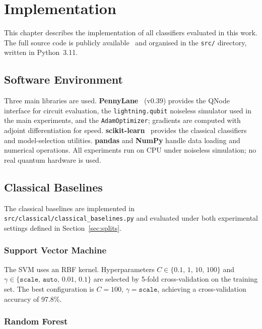 \chapter{Implementation}
\label{chap:implementation}

This chapter describes the implementation of all classifiers evaluated in this work. The full source code is publicly available~\cite{motamedifar2026repo} and organised in the \texttt{src/} directory, written in Python~3.11.

\section{Software Environment}
\label{sec:env}

Three main libraries are used. \textbf{PennyLane}~\cite{pennylane} (v0.39) provides the QNode interface for circuit evaluation, the \texttt{lightning.qubit} noiseless simulator used in the main experiments, and the \texttt{AdamOptimizer}; gradients are computed with adjoint differentiation for speed. \textbf{scikit-learn}~\cite{sklearn} provides the classical classifiers and model-selection utilities. \textbf{pandas} and \textbf{NumPy} handle data loading and numerical operations. All experiments run on CPU under noiseless simulation; no real quantum hardware is used.

\section{Classical Baselines}
\label{sec:impl_classical}

The classical baselines are implemented in \texttt{src/classical/classical\_baselines.py} and evaluated under both experimental settings defined in Section~\ref{sec:splits}.

\subsection{Support Vector Machine}

The SVM uses an RBF kernel. Hyperparameters $C \in \{0.1,\,1,\,10,\,100\}$ and $\gamma \in \{\texttt{scale},\,\texttt{auto},\,0.01,\,0.1\}$ are selected by 5-fold cross-validation on the training set. The best configuration is $C = 100$, $\gamma = \texttt{scale}$, achieving a cross-validation accuracy of 97.8\%.

\subsection{Random Forest}

